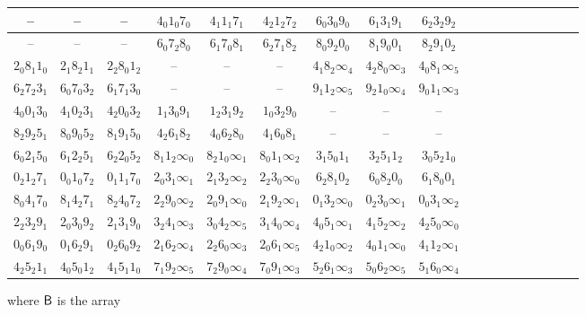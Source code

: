 \documentclass[draft, 11pt]{article}
\begin{document}
\begin{figure}[h!]
\renewcommand{\arraystretch}{1.2}
 \setlength\tabcolsep{1pt}
 \centering
 \small
\begin{tabular}{|c|c|c| c|c|c| c|c|c| c|c|c| c|c|c| c|c|c| }
\hline
-- & -- & -- & $4_0 1_0 7_0$ & $4_1 1_1 7_1$ & $4_2 1_2 7_2$ & $6_0 3_0 9_0$ & $6_1 3_1 9_1$ & $6_2 3_2 9_2$ \\\hline
-- & -- & -- & $6_0 7_2 8_0$ & $6_1 7_0 8_1$ & $6_2 7_1 8_2$ & $8_0 9_2 0_0$ & $8_1 9_0 0_1$ & $8_2 9_1 0_2$ \\\hline
$2_0 8_1 1_0$ & $2_1 8_2 1_1$ & $2_2 8_0 1_2$ & -- & -- & -- & $4_1 8_2 \infty_4$ & $4_2 8_0 \infty_3$ & $4_0 8_1 \infty_5$ \\\hline
$6_2 7_2 3_1$ & $6_0 7_0 3_2$ & $6_1 7_1 3_0$ & -- & -- & -- & $9_1 1_2 \infty_5$ & $9_2 1_0 \infty_4$ & $9_0 1_1 \infty_3$ \\\hline
$4_0 0_1 3_0$ & $4_1 0_2 3_1$ & $4_2 0_0 3_2$ & $1_1 3_0 9_1$ & $1_2 3_1 9_2$ & $1_0 3_2 9_0$ & -- & -- & -- \\\hline
$8_2 9_2 5_1$ & $8_0 9_0 5_2$ & $8_1 9_1 5_0$ & $4_2 6_1 8_2$ & $4_0 6_2 8_0$ & $4_1 6_0 8_1$ & -- & -- & -- \\\hline
$6_0 2_1 5_0$ & $6_1 2_2 5_1$ & $6_2 2_0 5_2$ & $8_1 1_2 \infty_0$ & $8_2 1_0 \infty_1$ & $8_0 1_1 \infty_2$ & $3_1 5_0 1_1$ & $3_2 5_1 1_2$ & $3_0 5_2 1_0$ \\\hline
$0_2 1_2 7_1$ & $0_0 1_0 7_2$ & $0_1 1_1 7_0$ & $2_0 3_1 \infty_1$ & $2_1 3_2 \infty_2$ & $2_2 3_0 \infty_0$ & $6_2 8_1 0_2$ & $6_0 8_2 0_0$ & $6_1 8_0 0_1$ \\\hline
$8_0 4_1 7_0$ & $8_1 4_2 7_1$ & $8_2 4_0 7_2$ & $2_2 9_0 \infty_2$ & $2_0 9_1 \infty_0$ & $2_1 9_2 \infty_1$ & $0_1 3_2 \infty_0$ & $0_2 3_0 \infty_1$ & $0_0 3_1 \infty_2$ \\\hline
$2_2 3_2 9_1$ & $2_0 3_0 9_2$ & $2_1 3_1 9_0$ & $3_2 4_1 \infty_3$ & $3_0 4_2 \infty_5$ & $3_1 4_0 \infty_4$ & $4_0 5_1 \infty_1$ & $4_1 5_2 \infty_2$ & $4_2 5_0 \infty_0$ \\\hline
$0_0 6_1 9_0$ & $0_1 6_2 9_1$ & $0_2 6_0 9_2$ & $2_1 6_2 \infty_4$ & $2_2 6_0 \infty_3$ & $2_0 6_1 \infty_5$ & $4_2 1_0 \infty_2$ & $4_0 1_1 \infty_0$ & $4_1 1_2 \infty_1$ \\\hline
$4_2 5_2 1_1$ & $4_0 5_0 1_2$ & $4_1 5_1 1_0$ & $7_1 9_2 \infty_5$ & $7_2 9_0 \infty_4$ & $7_0 9_1 \infty_3$ & $5_2 6_1 \infty_3$ & $5_0 6_2 \infty_5$ & $5_1 6_0 \infty_4$ \\\hline

\end{tabular}

\vskip 5pt
\normalsize \flushleft where ${\sf B}$ is the array
\vskip 5pt


\end{figure}
\end{document}
